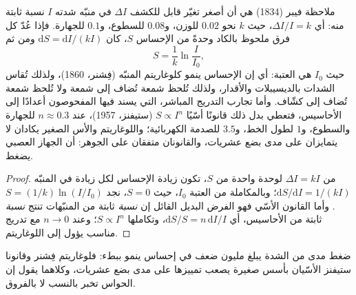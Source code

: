 \begin{theorem}\label{thm:b3:sensory-systems:weber}
ملاحظة فيبر (1834) هي أن أصغر تغيّر قابل للكشف $\Delta I$ في
منبّه شدته $I$ نسبة ثابتة منه: أي $\Delta I/I = k$، حيث $k$
نحو $0.02$ للوزن، و$0.08$ للسطوع، و$0.1$ للجهارة. فإذا عُدّ
كل فرق ملحوظ بالكاد وحدةً من الإحساس $S$، كان
$\mathrm{d}S = \mathrm{d}I/
(kI)$ ومن ثم
\[
S = \frac{1}{k}\ln\frac{I}{I_{0}} ,
\]
حيث $I_{0}$ هي العتبة: أي إن الإحساس ينمو كلوغاريتم المنبّه
(فِشنر، 1860)، ولذلك تُقاس الشدات بالديسيبلات والأقدار،
ولذلك تُلحظ شمعة تُضاف إلى شمعة ولا تُلحظ شمعة تُضاف إلى
كشّاف. وأما تجارب التدريج المباشر، التي يسند فيها المفحوصون
أعدادًا إلى الأحاسيس، فتعطي بدل ذلك قانونًا أسّيًا
$S \propto I^{n}$ (ستيفنز، 1957)، عند $n \approx
0.3$ للجهارة والسطوع، و$1$ لطول الخط، و$3.5$ للصدمة
الكهربائية؛ واللوغاريتم والأس الصغير يكادان لا يتمايزان على
مدى بضع عشريات، والقانونان متفقان على الجوهر: أن الجهاز
العصبي يضغط.
\end{theorem}
\begin{proof}
من $\Delta I = kI$ لوحدة واحدة من $S$، تكون زيادة الإحساس
لكل زيادة في المنبّه $\mathrm{d}S/\mathrm{d}I = 1/(kI)$؛
وبالمكاملة من العتبة $I_{0}$، حيث $S = 0$، نجد $S = (1/k)
\ln(I/I_{0})$. وأما القانون الأسّي فهو الفرض البديل القائل
إن \emph{نسبة} ثابتة من المنبّهات تنتج \emph{نسبة} ثابتة من
الأحاسيس، أي $\mathrm{d}S/S = n\,\mathrm{d}I/I$، وتكاملها
$S \propto I^{n}$؛ وعند $n \to 0$ مع تدريج مناسب يؤول إلى
اللوغاريتم.
\end{proof}

\begin{omfigure}

{\small ضغط مدى من الشدة يبلغ مليون ضعف في إحساس ينمو
ببطء: فلوغاريتم فِشنر وقانونا ستيفنز الأسّيان بأسس صغيرة
يصعب تمييزها على مدى بضع عشريات، وكلاهما يقول إن الحواس
تخبر بالنسب لا بالفروق.}
\end{omfigure}

